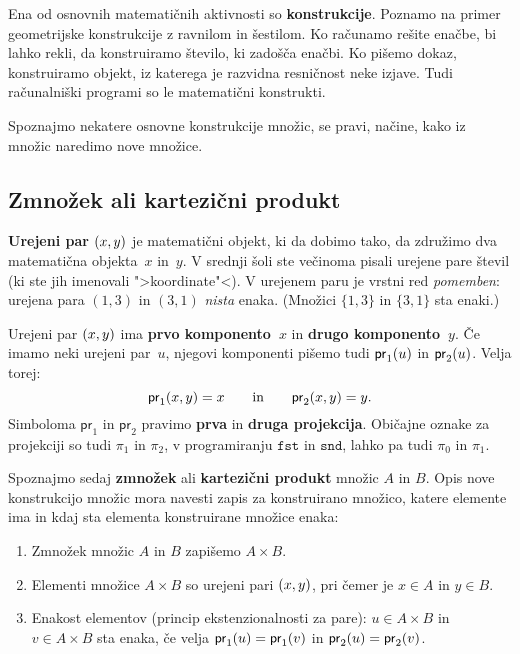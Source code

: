 Ena od osnovnih matematičnih aktivnosti so \textbf{konstrukcije}. Poznamo na primer geometrijske konstrukcije z ravnilom in šestilom. Ko računamo rešite enačbe, bi lahko rekli, da konstruiramo število, ki zadošča enačbi. Ko pišemo dokaz, konstruiramo objekt, iz katerega je razvidna resničnost neke izjave. Tudi računalniški programi so le matematični konstrukti.

Spoznajmo nekatere osnovne konstrukcije množic, se pravi, načine, kako iz množic naredimo nove množice.

\subsection{Zmnožek ali kartezični produkt}

\textbf{Urejeni par} $(x,y)$ je matematični objekt, ki da dobimo tako, da združimo dva matematična objekta~$x$ in~$y$. V srednji šoli ste večinoma pisali urejene pare števil (ki ste jih imenovali ">koordinate"<). V urejenem paru je vrstni red \emph{pomemben}: urejena para $(1, 3)$ in $(3, 1)$ \emph{nista} enaka. (Množici $\{1, 3\}$ in $\{3, 1\}$ sta enaki.)

Urejeni par $(x, y)$ ima \textbf{prvo komponento~$x$} in \textbf{drugo komponento~$y$}. Če imamo neki urejeni par~$u$, njegovi komponenti pišemo tudi $\mathsf{pr}_1(u)$ in $\mathsf{pr}_2(u)$. Velja torej:
%
\begin{equation*}
    \mathsf{pr}_1(x,y) = x
    \qquad\text{in}\qquad
    \mathsf{pr}_2(x,y) = y.  
\end{equation*}
%
Simboloma $\mathsf{pr}_1$ in $\mathsf{pr}_2$ pravimo \textbf{prva} in \textbf{druga projekcija}. Običajne oznake za projekciji so tudi $\pi_1$ in $\pi_2$, v
programiranju $\mathtt{fst}$ in $\mathtt{snd}$, lahko pa tudi $\pi_0$ in $\pi_1$.

Spoznajmo sedaj \textbf{zmnožek} ali \textbf{kartezični produkt} množic $A$ in $B$. Opis nove konstrukcijo množic mora navesti zapis za konstruirano množico, katere elemente ima in kdaj sta elementa konstruirane množice enaka:
%
\begin{enumerate}
\item Zmnožek množic $A$ in $B$ zapišemo $A \times B$.
\item Elementi množice $A \times B$ so urejeni pari $(x, y)$, pri čemer je $x \in A$ in $y \in B$.
\item Enakost elementov (princip ekstenzionalnosti za pare): $u \in A \times B$ in $v \in A \times B$ sta enaka, če velja $\mathsf{pr}_1(u) = \mathsf{pr}_1(v)$ in $\mathsf{pr}_2(u) = \mathsf{pr}_2(v)$.
\end{enumerate}

